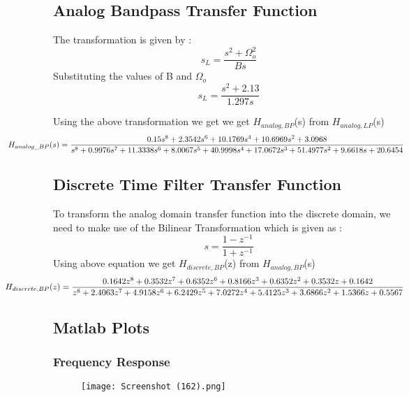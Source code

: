 \documentclass{article}
\begin{document}
\subsection{Analog Bandpass Transfer Function}
The transformation is given by :
\begin{equation*}
    s_L = \frac{s^2 + \Omega_o^2}{Bs}
\end{equation*}
Substituting the values of B and $\Omega_o$
\begin{equation*}
    s_L = \frac{s^2 + 2.13}{1.297s}
\end{equation*}

Using the above transformation we get we get $H_{analog,BP}$(s)  from $H_{analog,LP}$(s)
\begin{equation*}
    \hspace*{-2cm}
    H_{analog\_BP}(s) = \frac{0.15s^8 + 2.3542s^6 + 10.1769s^4 + 10.6969s^2 + 3.0968}{s^8 + 0.9976s^7 + 11.3338s^6 + 8.0067s^5 + 40.9998s^4 + 17.0672s^3 + 51.4977s^2 + 9.6618s + 20.6454}
\end{equation*}

\subsection{Discrete Time Filter Transfer Function}
To transform the analog domain transfer function into the discrete domain, we need to make use of the Bilinear Transformation which is given as :
\begin{equation*}
    s = \frac{1 - z^{-1}}{1 + z^{-1}}
\end{equation*}
Using  above  equation  we  get $H_{discrete,BP}$(z)  from $H_{analog,BP}$(s)
\begin{equation*}
\hspace*{-2cm}
    H_{discrete,BP}(z) = \frac{0.1642z^8 + 0.3532z^7 + 0.6352z^6 + 0.8166z^3 + 0.6352z^2 + 0.3532z + 0.1642}{z^8 + 2.4063z^7 + 4.9158z^6 + 6.2429z^5 + 7.0272z^4 + 5.4125z^3 + 3.6866z^2 + 1.5366z + 0.5567}   
\end{equation*}

\subsection{Matlab Plots}
\subsubsection{Frequency Response}
\begin{figure}[H]
\hspace*{-2.5cm}
    \centering
    \texttt{[image: Screenshot (162).png]}
    \label{fig:my_label}
\end{figure}
\end{document}
